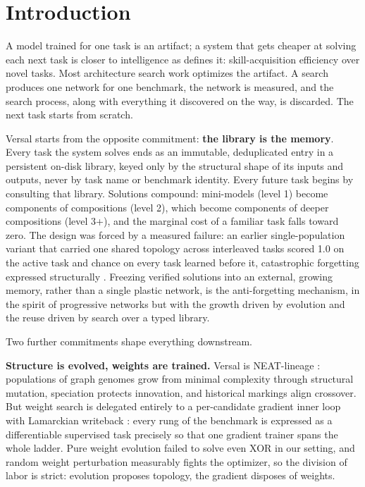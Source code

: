\documentclass[11pt]{article}
\begin{document}
\section{Introduction}

A model trained for one task is an artifact; a system that gets cheaper at solving each next task is closer to intelligence as \citet{chollet2019} defines it: skill-acquisition efficiency over novel tasks. Most architecture search work optimizes the artifact. A search produces one network for one benchmark, the network is measured, and the search process, along with everything it discovered on the way, is discarded. The next task starts from scratch.

Versal starts from the opposite commitment: \textbf{the library is the memory}. Every task the system solves ends as an immutable, deduplicated entry in a persistent on-disk library, keyed only by the structural shape of its inputs and outputs, never by task name or benchmark identity. Every future task begins by consulting that library. Solutions compound: mini-models (level 1) become components of compositions (level 2), which become components of deeper compositions (level 3+), and the marginal cost of a familiar task falls toward zero. The design was forced by a measured failure: an earlier single-population variant that carried one shared topology across interleaved tasks scored 1.0 on the active task and chance on every task learned before it, catastrophic forgetting expressed structurally \citep{mccloskey1989, french1999}. Freezing verified solutions into an external, growing memory, rather than a single plastic network, is the anti-forgetting mechanism, in the spirit of progressive networks \citep{rusu2016} but with the growth driven by evolution and the reuse driven by search over a typed library.

Two further commitments shape everything downstream.

\textbf{Structure is evolved, weights are trained.} Versal is NEAT-lineage \citep{stanley2002}: populations of graph genomes grow from minimal complexity through structural mutation, speciation protects innovation, and historical markings align crossover. But weight search is delegated entirely to a per-candidate gradient inner loop with Lamarckian writeback \citep{whitley1994, hinton1987}: every rung of the benchmark is expressed as a differentiable supervised task precisely so that one gradient trainer spans the whole ladder. Pure weight evolution failed to solve even XOR in our setting, and random weight perturbation measurably fights the optimizer, so the division of labor is strict: evolution proposes topology, the gradient disposes of weights.
\end{document}
